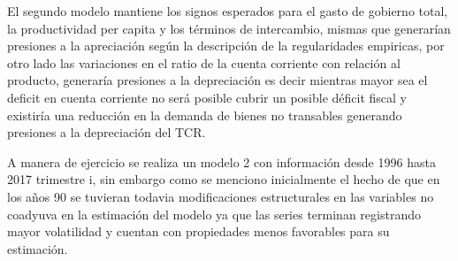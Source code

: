\documentclass[12pt,letterpaper]{article}
\begin{document}
El segundo modelo mantiene los signos esperados para el gasto de gobierno total, la productividad per capita y los términos de intercambio, mismas que generarían presiones a la apreciación según la descripción de la regularidades empiricas, por otro lado las variaciones en el ratio de la cuenta corriente con relación al producto, generaría presiones a la depreciación es decir mientras mayor sea el deficit en cuenta corriente no será posible cubrir un posible déficit fiscal y existiría una reducción en la demanda de bienes no transables generando presiones a la depreciación del TCR. 

A manera de ejercicio se realiza un modelo 2 con información desde 1996 hasta 2017 trimestre i, sin embargo como se menciono inicialmente el hecho de que en los años 90 se tuvieran todavia modificaciones estructurales en las variables no coadyuva en la estimación del modelo ya que las series terminan registrando mayor volatilidad y cuentan con propiedades menos favorables para su estimación. 
\end{document}
